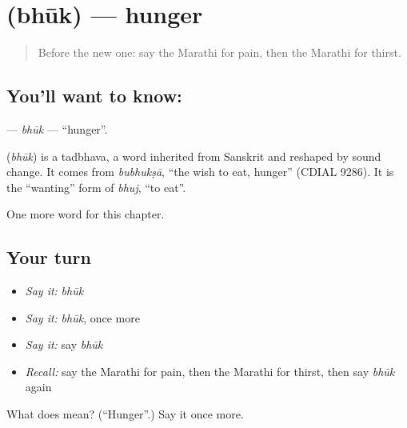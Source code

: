 \section[\texorpdfstring{\mr{भूक} (bhūk)}{भूक (bhūk)}]{ (bhūk) — hunger}

\label{lesson:MR-C73-bhuk}



\begin{quote}
Before the new one: say the Marathi for pain, then the Marathi for thirst.
\end{quote}

\subsection*{You'll want to know: }
\textbf{} — \emph{bhūk} — \textquotedblleft{}hunger\textquotedblright{}.

\begin{cousinweb}
\textbf{} (\emph{bhūk}) is a tadbhava, a word inherited from Sanskrit and reshaped by sound change. It comes from \emph{bubhukṣā}, \textquotedblleft{}the wish to eat, hunger\textquotedblright{} (CDIAL 9286). It is the \textquotedblleft{}wanting\textquotedblright{} form of \emph{bhuj}, \textquotedblleft{}to eat\textquotedblright{}.
\end{cousinweb}

\begin{grammarlens}[title={What you've built}]
One more word for this chapter.
\end{grammarlens}

\subsection*{Your turn}
\begin{itemize}
\raggedright
  \item \emph{Say it:} \emph{bhūk}
  \item \emph{Say it:} \emph{bhūk}, once more
  \item \emph{Say it:} say \emph{bhūk}
  \item \emph{Recall:} say the Marathi for pain, then the Marathi for thirst, then say \emph{bhūk} again
\end{itemize}

\begin{tcolorbox}[breakable,colback=teal!4,colframe=teal!35!black,title={Before you move on}]
What does  mean? (\textquotedblleft{}Hunger\textquotedblright{}.) Say it once more.
\end{tcolorbox}

